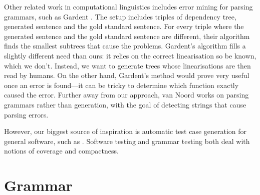 Other related work in computational linguistics includes error mining
for parsing grammars, such as Gardent
\cite{gardent2012errormining}. The setup includes triples of dependency
tree, generated sentence and the gold standard sentence. For every triple
where the generated sentence and the gold standard sentence are different, their algorithm
finds the smallest subtrees that cause the problems. Gardent's
algorithm fills a slightly different need than ours: it relies on the
correct linearisation so be known, which we don't. Instead, we want to
generate trees whose linearisations are then read by humans. On the
other hand, Gardent's method would prove very useful once an error is
found---it can be tricky to determine which function exactly caused
the error.
Further away from our approach, van Noord \cite{vanNoord2004}
works on parsing grammars rather than generation, with the goal of
detecting strings that cause parsing errors.


However, our biggest source of inspiration is automatic test case
generation for general software, such as 
\cite{hamon2004testgen}. Software testing and grammar testing both
deal with notions of coverage and compactness.


\section{Grammar}


